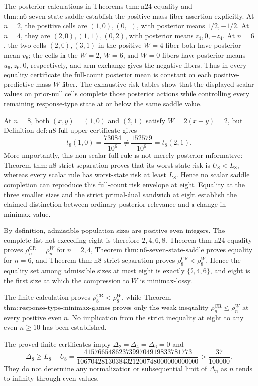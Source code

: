 The posterior calculations in Theorems \(\mathrm{thm{:}n24\mbox{-}equality}\) and \(\mathrm{thm{:}n6\mbox{-}seven\mbox{-}state\mbox{-}saddle}\) establish the positive-mass fiber assertion explicitly.  At \(n=2\), the positive cells are \((1,0),(0,1)\), with posterior means \(1/2,-1/2\).  At \(n=4\), they are \((2,0),(1,1),(0,2)\), with posterior means \(z_4,0,-z_4\).  At \(n=6\), the two cells \((2,0),(3,1)\) in the positive \(W=4\) fiber both have posterior mean \(v_6\); the cells in the \(W=2\), \(W=6\), and \(W=0\) fibers have posterior means \(u_6,z_6,0\), respectively, and arm exchange gives the negative fibers.  Thus in every equality certificate the full-count posterior mean is constant on each positive-predictive-mass \(W\)-fiber.  The exhaustive risk tables show that the displayed scalar values on prior-null cells complete those posterior actions while controlling every remaining response-type state at or below the same saddle value.

At \(n=8\), both \((x,y)=(1,0)\) and \((2,1)\) satisfy \(W=2(x-y)=2\), but Definition \(\mathrm{def{:}n8\mbox{-}full\mbox{-}upper\mbox{-}certificate}\) gives
\[
 t_8(1,0)=\frac{73084}{10^6}\neq
 \frac{152579}{10^6}=t_8(2,1).
\]
More importantly, this non-scalar full rule is not merely posterior-informative: Theorem \(\mathrm{thm{:}n8\mbox{-}strict\mbox{-}separation}\) proves that its worst-state risk is \(U_8<L_8\), whereas every scalar rule has worst-state risk at least \(L_8\).  Hence no scalar saddle completion can reproduce this full-count risk envelope at eight.  Equality at the three smaller sizes and the strict primal-dual sandwich at eight establish the claimed distinction between ordinary posterior relevance and a change in minimax value.

By definition, admissible population sizes are positive even integers.  The complete list not exceeding eight is therefore \(2,4,6,8\).  Theorem \(\mathrm{thm{:}n24\mbox{-}equality}\) proves \(\rho_n^{\mathrm{CR}}=\rho_n^W\) for \(n=2,4\), Theorem \(\mathrm{thm{:}n6\mbox{-}seven\mbox{-}state\mbox{-}saddle}\) proves equality for \(n=6\), and Theorem \(\mathrm{thm{:}n8\mbox{-}strict\mbox{-}separation}\) proves \(\rho_8^{\mathrm{CR}}<\rho_8^W\).  Hence the equality set among admissible sizes at most eight is exactly \(\{2,4,6\}\), and eight is the first size at which the compression to \(W\) is minimax-lossy.

The finite calculation proves \(\rho_8^{\mathrm{CR}}<\rho_8^W\), while Theorem \(\mathrm{thm{:}response\mbox{-}type\mbox{-}minimax\mbox{-}games}\) proves only the weak inequality \(\rho_n^{\mathrm{CR}}\leq\rho_n^W\) at every positive even \(n\).  No implication from the strict inequality at eight to any even \(n\geq10\) has been established.

The proved finite certificates imply \(\Delta_2=\Delta_4=\Delta_6=0\) and
\[
 \Delta_8\geq L_8-U_8
 =\frac{4157665486237399704919833781773}
 {10670428130384321200748000000000000}
 >\frac{37}{100000}.
\]
They do not determine any normalization or subsequential limit of \(\Delta_n\) as \(n\) tends to infinity through even values.
